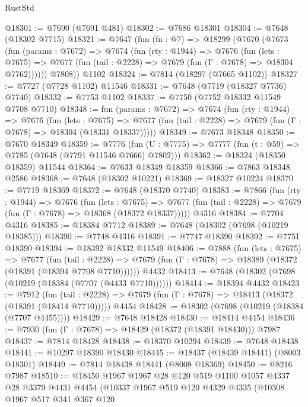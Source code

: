 \begin{lexlean}{RustStd}
\begin{coremodule}
@18301 := @7690 (@7691 @481)
@18302 := @7686 @18301
@18304 := @7648 (@18302 @7715)
@18321 := @7647
    (fun (fn : @7) =>
    @18299
      (@7670
        (@7673
          (fun (params : @7672) =>
          @7674
            (fun (rty : @1944) =>
            @7676
              (fun (lets : @7675) =>
              @7677 (fun (tail : @2228) => @7679 (fun (Γ : @7678) => @18304 @7762))))))
        @7808))
    @1102
@18324 := @7814 (@18297 (@7665 @1102))
@18327 := @7727 (@7728 @1102) @11546
@18331 := @7648 (@7719 (@18327 @7736) @7740)
@18332 := @7753 @1102
@18337 := @7750 (@7752 @18332 @11549 @7708 @7710)
@18348 := fun (params : @7672) =>
  @7674
    (fun (rty : @1944) =>
    @7676
      (fun (lets : @7675) =>
      @7677 (fun (tail : @2228) => @7679 (fun (Γ : @7678) => @18304 (@18331 @18337)))))
@18349 := @7673 @18348
@18350 := @7670 @18349
@18359 := @7776
    (fun (U : @7775) => @7777 (fun (t : @59) => @7785 (@7648 (@7791 @11546 @7666) @7802)))
@18362 := @18324 (@18350 @18359) @11544
@18364 := @7633 @18349 @18359
@18366 := @7863 @18348 @2586
@18368 := @7648 (@18302 @10221)
@18369 := @18327 @10224
@18370 := @7719 @18369
@18372 := @7648 (@18370 @7740)
@18383 := @7866
    (fun (rty : @1944) =>
    @7676
      (fun (lets : @7675) =>
      @7677 (fun (tail : @2228) => @7679 (fun (Γ : @7678) => @18368 (@18372 @18337)))))
    @4316
@18384 := @7704 @4316
@18385 := @18384 @7712
@18389 := @7648 (@18302 (@7698 (@10219 @18385)))
@18390 := @7748 @4316
@18391 := @7747 @18390
@18392 := @7751 @18390
@18394 := @18392 @18332 @11549
@18406 := @7888
    (fun (lets : @7675) =>
    @7677
      (fun (tail : @2228) =>
      @7679 (fun (Γ : @7678) => @18389 (@18372 (@18391 (@18394 @7708 @7710))))))
    @4432
@18413 := @7648 (@18302 (@7698 (@10219 (@18384 (@7707 (@4433 @7710))))))
@18414 := @18394 @4432
@18423 := @7912
    (fun (tail : @2228) => @7679 (fun (Γ : @7678) => @18413 (@18372 (@18391 (@18414 @7710)))))
    @4454
@18428 := @18302 (@7698 (@10219 (@18384 (@7707 @4455))))
@18429 := @7648 @18428
@18430 := @18414 @4454
@18436 := @7930 (fun (Γ : @7678) => @18429 (@18372 (@18391 @18430))) @7987
@18437 := @7814 @18428
@18438 := @18370 @10294
@18439 := @7648 @18438
@18441 := @10297 @18390 @18430
@18445 := @18437 (@18439 @18441) (@8003 @18301)
@18449 := @7814 @18438 @18441 (@8008 @18369)
@18450 := @8216 @7987
@18510 := @18450
    @1967
    @1967
    @28
    @120
    @519
    @1100
    @1057
    @4337
    @28
    @3379
    @4431
    @4454
    (@10337
      @1967
      @519
      @120
      @4329
      @4335
      (@10308
        @1967
        @517
        @341
        @367
        @120

\end{coremodule}
\end{lexlean}
